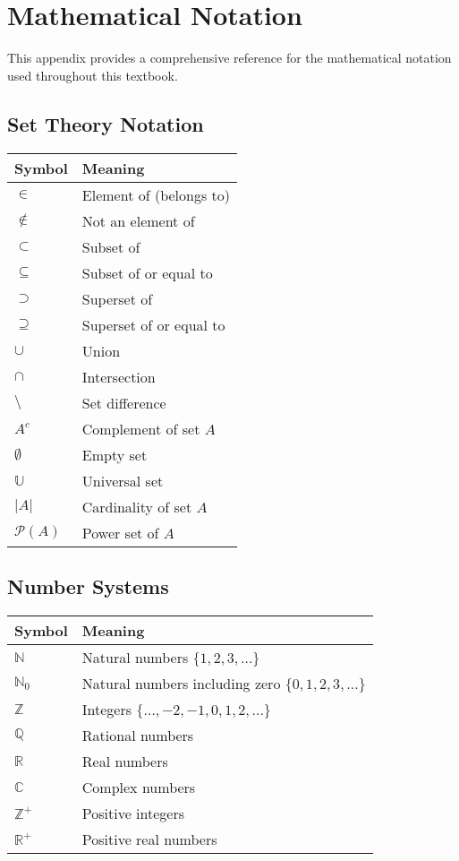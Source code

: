 \chapter{Mathematical Notation}

This appendix provides a comprehensive reference for the mathematical notation used throughout this textbook.

\section{Set Theory Notation}

\begin{tabular}{|l|l|}
\hline
\textbf{Symbol} & \textbf{Meaning} \\
\hline
$\in$ & Element of (belongs to) \\
$\notin$ & Not an element of \\
$\subset$ & Subset of \\
$\subseteq$ & Subset of or equal to \\
$\supset$ & Superset of \\
$\supseteq$ & Superset of or equal to \\
$\cup$ & Union \\
$\cap$ & Intersection \\
$\setminus$ & Set difference \\
$A^c$ & Complement of set $A$ \\
$\emptyset$ & Empty set \\
$\mathbb{U}$ & Universal set \\
$|A|$ & Cardinality of set $A$ \\
$\mathcal{P}(A)$ & Power set of $A$ \\
\hline
\end{tabular}

\section{Number Systems}

\begin{tabular}{|l|l|}
\hline
\textbf{Symbol} & \textbf{Meaning} \\
\hline
$\mathbb{N}$ & Natural numbers $\{1, 2, 3, \ldots\}$ \\
$\mathbb{N}_0$ & Natural numbers including zero $\{0, 1, 2, 3, \ldots\}$ \\
$\mathbb{Z}$ & Integers $\{\ldots, -2, -1, 0, 1, 2, \ldots\}$ \\
$\mathbb{Q}$ & Rational numbers \\
$\mathbb{R}$ & Real numbers \\
$\mathbb{C}$ & Complex numbers \\
$\mathbb{Z}^+$ & Positive integers \\
$\mathbb{R}^+$ & Positive real numbers \\
\hline
\end{tabular}

